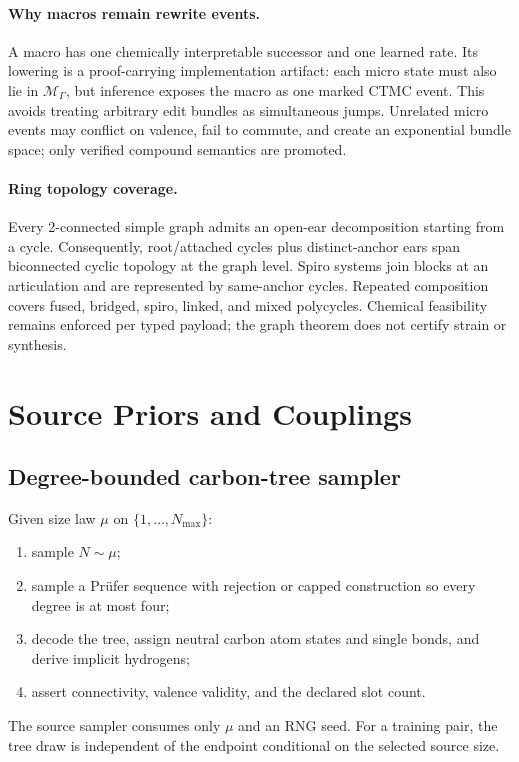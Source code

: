 \documentclass{article}
\newcommand{\M}{\mathcal{M}_{\Gamma}}
\theoremstyle{definition}
\theoremstyle{remark}
\begin{document}
\paragraph{Why macros remain rewrite events.}
A macro has one chemically interpretable successor and one learned rate. Its lowering is a proof-carrying implementation artifact: each micro state must also lie in $\M$, but inference exposes the macro as one marked CTMC event. This avoids treating arbitrary edit bundles as simultaneous jumps. Unrelated micro events may conflict on valence, fail to commute, and create an exponential bundle space; only verified compound semantics are promoted.

\paragraph{Ring topology coverage.}
Every 2-connected simple graph admits an open-ear decomposition starting from a cycle. Consequently, root/attached cycles plus distinct-anchor ears span biconnected cyclic topology at the graph level. Spiro systems join blocks at an articulation and are represented by same-anchor cycles. Repeated composition covers fused, bridged, spiro, linked, and mixed polycycles. Chemical feasibility remains enforced per typed payload; the graph theorem does not certify strain or synthesis.

\section{Source Priors and Couplings}\label{app:prior}

\subsection{Degree-bounded carbon-tree sampler}

Given size law $\mu$ on $\{1,\ldots,N_{\max}\}$:
\begin{enumerate}[leftmargin=*]
    \item sample $N\sim\mu$;
    \item sample a Pr\"ufer sequence with rejection or capped construction so every degree is at most four;
    \item decode the tree, assign neutral carbon atom states and single bonds, and derive implicit hydrogens;
    \item assert connectivity, valence validity, and the declared slot count.
\end{enumerate}
The source sampler consumes only $\mu$ and an RNG seed. For a training pair, the tree draw is independent of the endpoint conditional on the selected source size.
\end{document}
